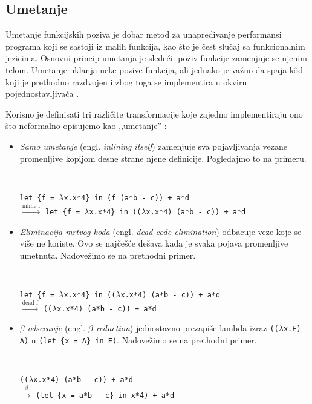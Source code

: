 \subsection{Umetanje}
Umetanje funkcijskih poziva je dobar metod za unapređivanje performansi programa koji se sastoji iz malih funkcija, kao što je čest slučaj sa funkcionalnim jezicima. Osnovni princip umetanja je sledeći: poziv funkcije zamenjuje se njenim telom. Umetanje uklanja neke pozive funkcija, ali jednako je važno da spaja k\^ od koji je prethodno razdvojen i zbog toga se implementira u okviru pojednostavljivača \cite{compilation-by-program-transformation}.

Korisno je definisati tri različite transformacije koje zajedno implementiraju ono što neformalno opisujemo kao ‚‚umetanje'' \cite{secrets-haskell-compiler-inliner, compilation-by-program-transformation}:
\begin{itemize}
	\item \textit{Samo umetanje} (engl. \textit{inlining itself}) zamenjuje sva pojavljivanja vezane promenljive kopijom desne strane njene definicije. Pogledajmo to na primeru.
	\begin{primer} ~
		\begin{center}
			\verb|let {f = |$\lambda$\verb|x.x*4} in (f (a*b - c)) + a*d| \\
			$\stackrel{\text{inline f}}{\longrightarrow}$ \verb|let {f = |$\lambda$\verb|x.x*4} in ((|$\lambda$\verb|x.x*4) (a*b - c)) + a*d|
		\end{center}
	\end{primer}
	
	\item \textit{Eliminacija mrtvog koda} (engl. \textit{dead code elimination}) odbacuje veze koje se više ne koriste. Ovo se najčešće dešava kada je svaka pojava promenljive umetnuta. Nadovežimo se na prethodni primer.
	\begin{primer} ~
		\begin{center}
			\verb|let {f = |$\lambda$\verb|x.x*4} in ((|$\lambda$\verb|x.x*4) (a*b - c)) + a*d| \\
			$\stackrel{\text{dead f}}{\longrightarrow}$ \verb|((|$\lambda$\verb|x.x*4) (a*b - c)) + a*d| 
		\end{center}
	\end{primer}
	
	\item \textit{$\beta$-odsecanje} (engl. \textit{$\beta$-reduction}) jednostavno prezapiše lambda izraz \verb|((|$\lambda$\verb|x.E) A)| u \verb|(let {x = A} in E)|. Nadovežimo se na prethodni primer.
	\begin{primer} ~
		\begin{center}
			\verb|((|$\lambda$\verb|x.x*4) (a*b - c)) + a*d| \\
			$\stackrel{\beta}{\longrightarrow}$ \verb|(let {x = a*b - c} in x*4) + a*d| 
		\end{center}
	\end{primer}
\end{itemize}

